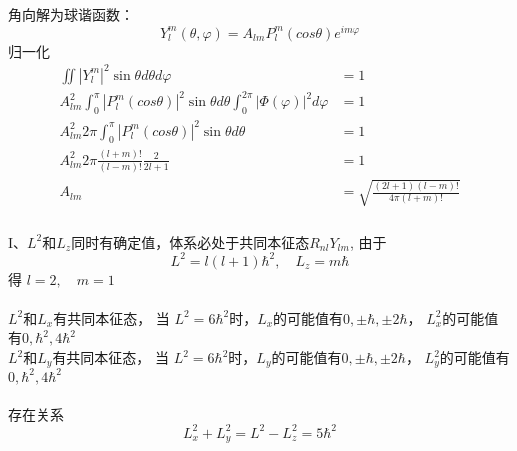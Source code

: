 \begin{frame}
\frametitle{}
角向解为球谐函数：
\begin{equation*}
  Y_{l}^{m} (\theta,\varphi)= A_{lm}  P_l ^m (cos \theta)  e^{im\varphi} 
\end{equation*}	
归一化
\begin{equation*}
\begin{split}
   \iint  |Y_{l}^{m}| ^2  \sin \theta d \theta d \varphi  & =1  \\
    A^2_{lm} \int_0^{\pi}  |P_l ^m (cos \theta)|^2 \sin\theta d \theta \int_0^{2\pi} |\Phi (\varphi)|^2 d \varphi  & =1  \\
      A^2_{lm} 2\pi  \int_{0}^{\pi}    |P_l ^m (cos \theta)|^2  \sin \theta d\theta &=1 \\
      A^2_{lm}  2\pi  \frac{(l+m)!}{(l-m)!}  \frac{2}{2l+1}  &=1 \\
      A_{lm} &= \sqrt{\frac{(2l+1)(l-m)!}{4\pi (l+m)!}}
\end{split}		
\end{equation*}	 
\end{frame}	

\begin{frame}[label=current]
  \frametitle{}
\解 I、$L^2$和$L_z$同时有确定值，体系必处于共同本征态$R_{nl}Y_{lm}$, 由于
\[ L^2 = l(l+1)\hbar^2, \quad L_z = m\hbar\]
 得 $l=2, \quad m=1$\\
 ~~\\
$L^2$和$L_x$有共同本征态， 当 $L^2 = 6\hbar^2$时，$L_x$的可能值有$0, \pm \hbar, \pm 2\hbar $， $L^2_x$的可能值有$0, \hbar^2, 4\hbar^2 $ \\
$L^2$和$L_y$有共同本征态， 当 $L^2 = 6\hbar^2$时，$L_y$的可能值有$0, \pm \hbar, \pm 2\hbar $， $L^2_y$的可能值有$0, \hbar^2, 4\hbar^2 $  \\
~~\\ 
存在关系
\[ L^2_x + L^2_y = L^2 -L^2_z = 5\hbar^2\]
\end{frame} 

